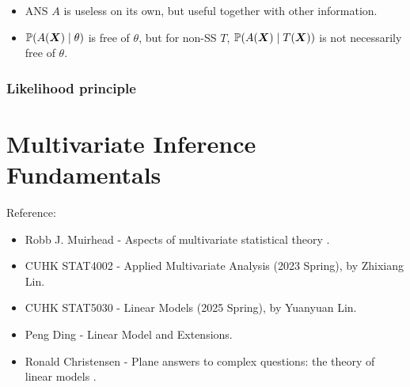 \documentclass[10pt,a4paper]{book}
\begin{document}
\begin{remark}\label{rmk:SS-MSS-ANS-CS}
	\begin{itemize}
		\item ANS $A$ is useless on its own, but useful together with other information. 
		\item $\mathbb P(A({\boldsymbol X})\mid \theta)$ is free of $\theta$, but for non-SS $T$, $\mathbb P(A({\boldsymbol X})\mid T({\boldsymbol X}))$ is not necessarily free of $\theta$. 
	\end{itemize}
\end{remark}

\subsection{Likelihood principle}\label{sec:prin-data-reduce-lik}




\chapter{Multivariate Inference Fundamentals}\label{chap:multi}
Reference: 
\begin{itemize}
	\item Robb J. Muirhead - Aspects of multivariate statistical theory \cite{muirhead1982aspects}.
	\item CUHK STAT4002 - Applied Multivariate Analysis (2023 Spring), by Zhixiang Lin.
	\item CUHK STAT5030 - Linear Models (2025 Spring), by Yuanyuan Lin.
	\item Peng Ding - Linear Model and Extensions.
	\item Ronald Christensen - Plane answers to
	complex questions: the theory of linear models \cite{christensen2002plane}.
\end{itemize}
\end{document}
